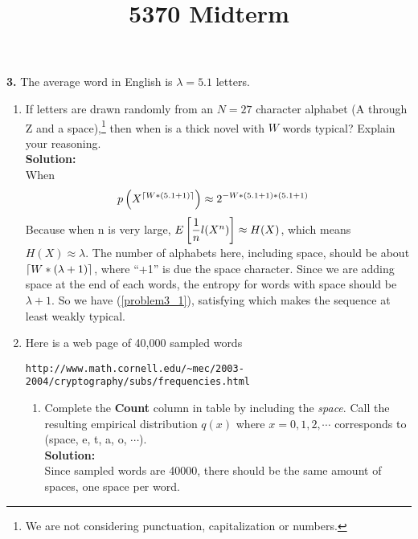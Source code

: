 \documentclass{assignment}
\title{5370 Midterm}
\begin{document}
\textbf{3.}
\label{SquishyBear}
The average word in English is $\lambda =5.1$ letters.
\begin{enumerate}
\item  If letters are drawn randomly from an $N=27$ character alphabet (A through Z and a space),\footnote{
    We are not considering punctuation, capitalization or numbers.
  }
  then when is a thick novel with $W$ words typical? Explain your reasoning. \\

  \textbf{Solution:} \\
  When
  \begin{align}
    p\left(X^{\left \lceil W*(5.1 + 1) \right \rceil}\right) & \approx 2^{-W*(5.1 + 1)*(5.1 + 1)} \label{problem3_1}
  \end{align}
  Because when n is very large, $E\left[\dfrac{1}{n}l(X^n)\right] \approx H(X)$, which means $H(X) \approx \lambda$. The number of alphabets
  here, including space, should be about $\left \lceil W * (\lambda + 1) \right \rceil$, where ``+1'' is due the space character. Since
  we are adding space at the end of each words, the entropy for words with space should be $\lambda + 1$. So we have
  (\ref{problem3_1}), satisfying which makes the sequence at least weakly typical.

\item Here is a web page of 40,000 sampled words
  \begin{center}
    \verb"http://www.math.cornell.edu/~mec/2003-2004/cryptography/subs/frequencies.html"
  \end{center}
  \begin{enumerate}
  \item Complete the {\bf Count} column in table by including the {\em space}. Call the resulting empirical
    distribution $q(x)$ where $x=0,1,2,\cdots$ corresponds to (space, e, t, a, o, $\cdots$). \\
    \textbf{Solution:} \\
    Since sampled words are 40000, there should be the same amount of spaces, one space per word.


\end{enumerate}
\end{enumerate}
\end{document}
